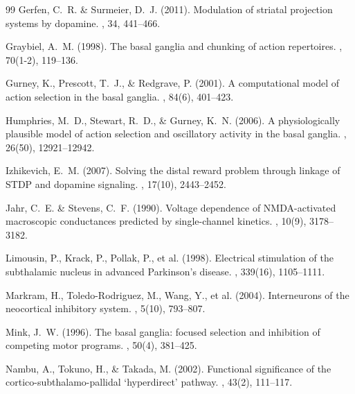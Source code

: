 \documentclass[11pt,a4paper]{article}
\begin{document}
\begin{thebibliography}{99}
Gerfen, C.~R. \& Surmeier, D.~J. (2011).
\newblock Modulation of striatal projection systems by dopamine.
, 34, 441--466.

Graybiel, A.~M. (1998).
\newblock The basal ganglia and chunking of action repertoires.
, 70(1-2), 119--136.

Gurney, K., Prescott, T.~J., \& Redgrave, P. (2001).
\newblock A computational model of action selection in the basal ganglia.
, 84(6), 401--423.

Humphries, M.~D., Stewart, R.~D., \& Gurney, K.~N. (2006).
\newblock A physiologically plausible model of action selection and oscillatory activity in the basal ganglia.
, 26(50), 12921--12942.

Izhikevich, E.~M. (2007).
\newblock Solving the distal reward problem through linkage of STDP and dopamine signaling.
, 17(10), 2443--2452.

Jahr, C.~E. \& Stevens, C.~F. (1990).
\newblock Voltage dependence of NMDA-activated macroscopic conductances predicted by single-channel kinetics.
, 10(9), 3178--3182.

Limousin, P., Krack, P., Pollak, P., et al. (1998).
\newblock Electrical stimulation of the subthalamic nucleus in advanced Parkinson's disease.
, 339(16), 1105--1111.

Markram, H., Toledo-Rodriguez, M., Wang, Y., et al. (2004).
\newblock Interneurons of the neocortical inhibitory system.
, 5(10), 793--807.

Mink, J.~W. (1996).
\newblock The basal ganglia: focused selection and inhibition of competing motor programs.
, 50(4), 381--425.

Nambu, A., Tokuno, H., \& Takada, M. (2002).
\newblock Functional significance of the cortico-subthalamo-pallidal `hyperdirect' pathway.
, 43(2), 111--117.


\end{thebibliography}
\end{document}
